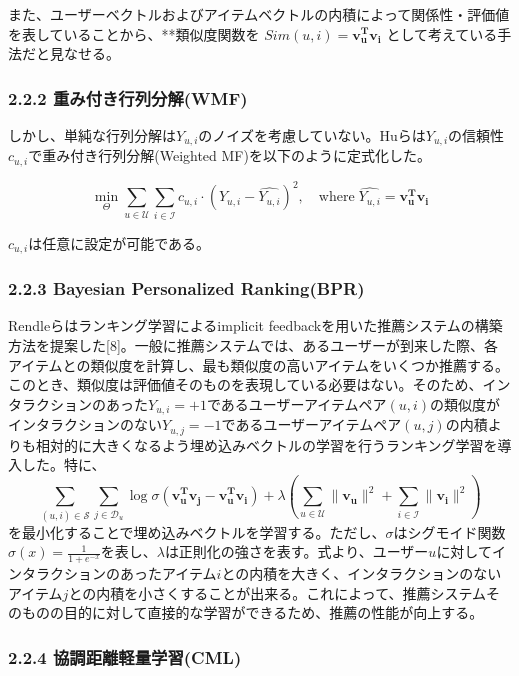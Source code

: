\documentclass[11pt,a4paper]{article}
\begin{document}
また、ユーザーベクトルおよびアイテムベクトルの内積によって関係性・評価値を表していることから、**類似度関数を $Sim(u, i) = \mathbf{v_u^T} \mathbf{v_i}$ として考えている手法だと見なせる。

\subsubsection*{2.2.2 重み付き行列分解(WMF)}

しかし、単純な行列分解は$Y_{u,i}$のノイズを考慮していない。Huらは$Y_{u,i}$の信頼性$c_{u,i}$で重み付き行列分解(Weighted MF)を以下のように定式化した。

$$
  \underset{\Theta}{\min} \sum_{u \in \mathcal{U}} \sum_{i \in \mathcal{I}} c_{u,i} \cdot (Y_{u,i} - \hat{Y_{u,i}})^2, \quad \text{where} \; \hat{Y_{u,i}} = \mathbf{v_u^T} \mathbf{v_i}
$$

$c_{u,i}$は任意に設定が可能である。

\subsubsection*{2.2.3 Bayesian Personalized Ranking(BPR)}

Rendleらはランキング学習によるimplicit feedbackを用いた推薦システムの構築方法を提案した[8]。一般に推薦システムでは、あるユーザーが到来した際、各アイテムとの類似度を計算し、最も類似度の高いアイテムをいくつか推薦する。このとき、類似度は評価値そのものを表現している必要はない。そのため、インタラクションのあった$Y_{u,i} = +1$であるユーザーアイテムペア$(u,i)$の類似度がインタラクションのない$Y_{u,j} = -1$であるユーザーアイテムペア$(u,j)$の内積よりも相対的に大きくなるよう埋め込みベクトルの学習を行うランキング学習を導入した。特に、
$$
  \sum_{(u,i) \in \mathcal{S}} \sum_{j \in \mathcal{D}_u} \log \sigma(\mathbf{v_u^T} \mathbf{v_j} - \mathbf{v_u^T} \mathbf{v_i}) + \lambda \left( \sum_{u \in \mathcal{U}} \| \mathbf{v_u} \|^2 + \sum_{i \in \mathcal{I}} \| \mathbf{v_i} \|^2 \right)
$$
を最小化することで埋め込みベクトルを学習する。ただし、$\sigma$はシグモイド関数$\sigma(x) = \frac{1}{1 + e^{-x}}$を表し、$\lambda$は正則化の強さを表す。式より、ユーザー$u$に対してインタラクションのあったアイテム$i$との内積を大きく、インタラクションのないアイテム$j$との内積を小さくすることが出来る。これによって、推薦システムそのものの目的に対して直接的な学習ができるため、推薦の性能が向上する。

\subsubsection*{2.2.4 協調距離軽量学習(CML)}
\end{document}
